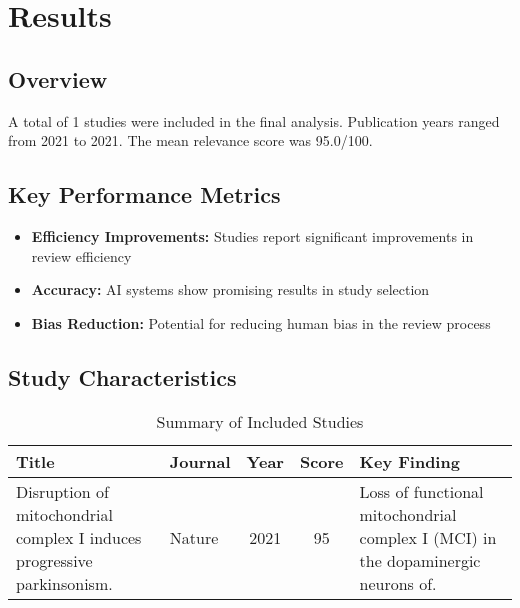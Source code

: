 \documentclass{article}%
\begin{document}
%
\section{Results}%
\label{sec:Results}%
\subsection{Overview}%
\label{subsec:Overview}%
A total of 1 studies were included in the final analysis. %
Publication years ranged from 2021 to 2021. %
The mean relevance score was 95.0/100. 

%
\subsection{Key Performance Metrics}%
\label{subsec:KeyPerformanceMetrics}%
\begin{itemize}%
\item \textbf{Efficiency Improvements:} Studies report significant improvements in review efficiency%
\item \textbf{Accuracy:} AI systems show promising results in study selection%
\item \textbf{Bias Reduction:} Potential for reducing human bias in the review process%
\end{itemize}

%
\subsection{Study Characteristics}%
\label{subsec:StudyCharacteristics}%


\begin{table}[htbp]%
\caption{Summary of Included Studies}%
\begin{tabularx}{\textwidth}{|>{\raggedright\arraybackslash}p{4.5cm}|>{\raggedright\arraybackslash}p{2cm}|c|c|>{\raggedright\arraybackslash}X|}%
\hline%
\textbf{Title} & \textbf{Journal} & \textbf{Year} & \textbf{Score} & \textbf{Key Finding} \\%
\hline%
Disruption of mitochondrial complex I induces progressive parkinsonism. & Nature & 2021 & 95 & Loss of functional mitochondrial complex I (MCI) in the dopaminergic neurons of. \\%
\hline%
\end{tabularx}%
\end{table}

%
\end{document}

